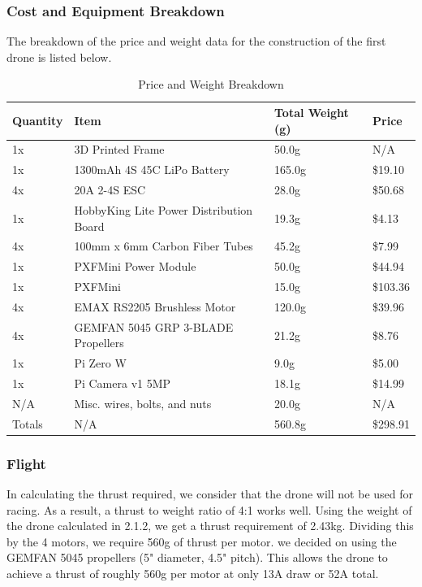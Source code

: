 \documentclass{article}
\begin{document}
\subsubsection{Cost and Equipment Breakdown}
The breakdown of the price and weight data for the construction of the first drone is listed below.
\begin{table}[h!]
\centering
\begin{tabular}{|l|l|l|l|}
\hline
Quantity & Item                                    & Total Weight (g) & Price    \\ \hline
1x       & 3D Printed Frame                        & 50.0g            & N/A      \\ \hline
1x       & 1300mAh 4S 45C LiPo Battery             & 165.0g           & \$19.10  \\ \hline
4x       & 20A 2-4S ESC                            & 28.0g            & \$50.68  \\ \hline
1x       & HobbyKing Lite Power Distribution Board & 19.3g            & \$4.13   \\ \hline
4x       & 100mm x 6mm Carbon Fiber Tubes          & 45.2g            & \$7.99   \\ \hline
1x       & PXFMini Power Module                    & 50.0g            & \$44.94  \\ \hline
1x       & PXFMini                                 & 15.0g            & \$103.36 \\ \hline
4x       & EMAX RS2205 Brushless Motor             & 120.0g           & \$39.96  \\ \hline
4x       & GEMFAN 5045 GRP 3-BLADE Propellers      & 21.2g            & \$8.76   \\ \hline
1x       & Pi Zero W                               & 9.0g             & \$5.00   \\ \hline
1x       & Pi Camera v1 5MP                        & 18.1g            & \$14.99  \\ \hline
N/A      & Misc. wires, bolts, and nuts            & 20.0g            & N/A      \\ \hline
Totals   & N/A                                     & 560.8g           & \$298.91 \\ \hline
\end{tabular}
\caption{Price and Weight Breakdown}
\end{table}

\subsubsection{Flight}
In calculating the thrust required, we consider that the drone will not be used for racing. As a result, a thrust to weight ratio of 4:1 works well. Using the weight of the drone calculated in 2.1.2, we get a thrust requirement of 2.43kg. Dividing this by the 4 motors, we require 560g of thrust per motor. we decided on using the GEMFAN 5045 propellers (5" diameter, 4.5" pitch). This allows the drone to achieve a thrust of roughly 560g per motor at only 13A draw or 52A total.
\end{document}
